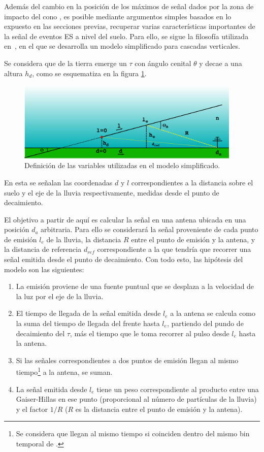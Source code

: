 	Adem\'as del cambio en la posici\'on de los m\'aximos de se\~nal dados por la zona de impacto del cono \cher{}, es posible mediante argumentos simples basados en lo expuesto en las secciones previas, recuperar varias caracter\'isticas importantes de la se\~nal de eventos ES a nivel del suelo.
	Para ello, se sigue la filosofía utilizada en~\cite{zhairezAir}, en el que se desarrolla un modelo simplificado para cascadas verticales.
	
	Se considera que de la tierra emerge un $\tau$ con ángulo cenital $\theta$ y decae a una altura $h_d$, como se esquematiza en la figura \ref{fig:esRadio_schema}. 
	\begin{figure}[ht!]
		\centering
		\includegraphics[width=0.95\textwidth]{./fig/EASRadio/timeDelaySchema}
		\caption{\label{fig:esRadio_schema}
		Definici\'on de las variables utilizadas en el modelo simplificado. 
		}
	\end{figure}
	En esta se señalan las coordenadas $d$ y $l$ correspondientes a la distancia sobre el suelo y el eje de la lluvia respectivamente, medidas desde el punto de decaimiento.
	
	El objetivo a partir de aqu\'i es calcular la señal en una antena ubicada en una posición $d_a$ arbitraria.
	Para ello se considerar\'a la señal proveniente de cada punto de emisión $l_e$ de la lluvia, la distancia $R$ entre el punto de emisión y la antena, y la distancia de referencia $d_{ref}$ correspondiente a la que tendr\'ia que recorrer una señal emitida desde el punto de decaimiento.
	Con todo esto, las hipótesis del modelo son las siguientes:
	\begin{enumerate}
	 \item La emisi\'on proviene de una fuente puntual que se desplaza a la velocidad de la luz por el eje de la lluvia.
	 \item El tiempo de llegada de la señal emitida desde $l_e$ a la antena se calcula como la suma del tiempo de llegada del frente hasta $l_e$, partiendo del pundo de decaimiento del $\tau$, m\'as el tiempo que le toma recorrer al pulso desde $l_e$ hasta la antena.
	 \item Si las señales correspondientes a dos puntos de emisión llegan al mismo tiempo\footnote{Se considera que llegan al mismo tiempo si coinciden dentro del mismo bin temporal de .} a la antena, se suman.
	 \item La señal emitida desde $l_e$ tiene un peso correspondiente al producto entre una Gaiser-Hillas en ese punto (proporcional al n\'umero de part\'iculas de la lluvia) y el factor $1/R$ ($R$ es la distancia entre el punto de emisión y la antena).
	\end{enumerate}
	
